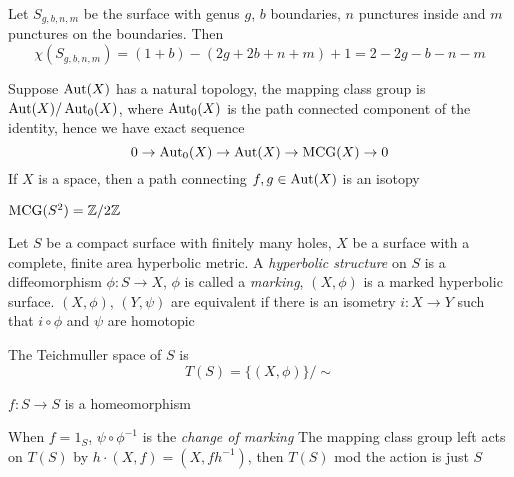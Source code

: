 \documentclass[main]{subfiles}
\begin{document}
Let $S_{g,b,n,m}$ be the surface with genus $g$, $b$ boundaries, $n$ punctures inside and $m$ punctures on the boundaries. Then
\[\chi(S_{g,b,n,m})=(1+b)-(2g+2b+n+m)+1=2-2g-b-n-m\]

\begin{definition}
Suppose $\operatorname{Aut}(X)$ has a natural topology, the mapping class group is $\operatorname{Aut}(X)/\operatorname{Aut}_0(X)$, where $\operatorname{Aut}_0(X)$ is the path connected component of the identity, hence we have exact sequence
\[0\to\operatorname{Aut}_0(X)\to\operatorname{Aut}(X)\to\operatorname{MCG}(X)\to0\]
If $X$ is a space, then a path connecting $f,g\in\operatorname{Aut}(X)$ is an isotopy
\end{definition}

\begin{example}
$\operatorname{MCG}(S^2)=\mathbb Z/2\mathbb Z$
\end{example}

\begin{definition}
Let $S$ be a compact surface with finitely many holes, $X$ be a surface with a complete, finite area hyperbolic metric. A \textit{hyperbolic structure} on $S$ is a diffeomorphism $\phi:S\to X$, $\phi$ is called a \textit{marking}, $(X,\phi)$ is a marked hyperbolic surface. $(X,\phi)$, $(Y,\psi)$ are equivalent if there is an isometry $i:X\to Y$ such that $i\circ\phi$ and $\psi$ are homotopic
\begin{center}
\end{center}
The Teichmuller space of $S$ is
\[T(S)=\{(X,\phi)\}/\sim\]
\end{definition}

\begin{definition}
$f:S\to S$ is a homeomorphism
\begin{center}
\end{center}
When $f=1_S$, $\psi\circ\phi^{-1}$ is the \textit{change of marking}
The mapping class group left acts on $T(S)$ by $h\cdot(X,f)=(X,fh^{-1})$, then $T(S)$ mod the action is just $S$
\end{definition}
\end{document}
